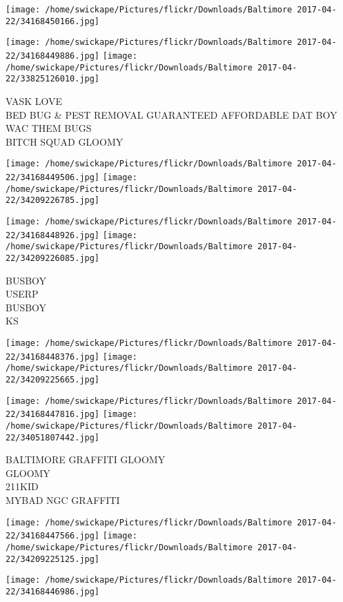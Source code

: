 \documentclass[10pt,letterpaper]{article}
\begin{document}
\texttt{[image: /home/swickape/Pictures/flickr/Downloads/Baltimore 2017-04-22/34168450166.jpg]}

\vspace{0.25in}
\texttt{[image: /home/swickape/Pictures/flickr/Downloads/Baltimore 2017-04-22/34168449886.jpg]}
\texttt{[image: /home/swickape/Pictures/flickr/Downloads/Baltimore 2017-04-22/33825126010.jpg]}

VASK LOVE\\
BED BUG \& PEST REMOVAL GUARANTEED AFFORDABLE DAT BOY WAC THEM BUGS\\
BITCH SQUAD GLOOMY
\pagebreak

\texttt{[image: /home/swickape/Pictures/flickr/Downloads/Baltimore 2017-04-22/34168449506.jpg]}
\texttt{[image: /home/swickape/Pictures/flickr/Downloads/Baltimore 2017-04-22/34209226785.jpg]}

\texttt{[image: /home/swickape/Pictures/flickr/Downloads/Baltimore 2017-04-22/34168448926.jpg]}
\texttt{[image: /home/swickape/Pictures/flickr/Downloads/Baltimore 2017-04-22/34209226085.jpg]}

BUSBOY\\
USERP\\
BUSBOY\\
KS
\pagebreak

\texttt{[image: /home/swickape/Pictures/flickr/Downloads/Baltimore 2017-04-22/34168448376.jpg]}
\texttt{[image: /home/swickape/Pictures/flickr/Downloads/Baltimore 2017-04-22/34209225665.jpg]}

\texttt{[image: /home/swickape/Pictures/flickr/Downloads/Baltimore 2017-04-22/34168447816.jpg]}
\texttt{[image: /home/swickape/Pictures/flickr/Downloads/Baltimore 2017-04-22/34051807442.jpg]}

BALTIMORE GRAFFITI GLOOMY\\
GLOOMY\\
211KID\\
MYBAD NGC GRAFFITI
\pagebreak

\texttt{[image: /home/swickape/Pictures/flickr/Downloads/Baltimore 2017-04-22/34168447566.jpg]}
\texttt{[image: /home/swickape/Pictures/flickr/Downloads/Baltimore 2017-04-22/34209225125.jpg]}

\vspace{0.25in}
\texttt{[image: /home/swickape/Pictures/flickr/Downloads/Baltimore 2017-04-22/34168446986.jpg]}
\end{document}
